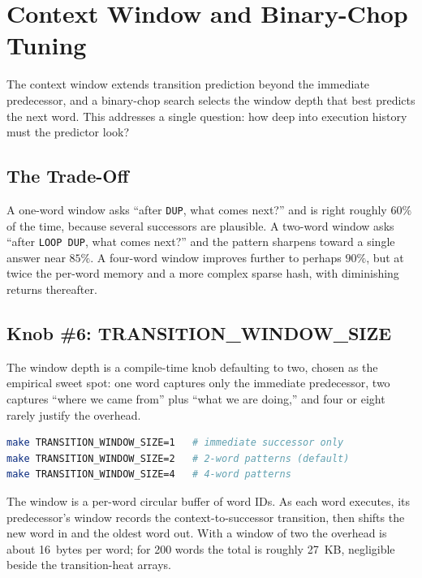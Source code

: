 
\section{Context Window and Binary-Chop Tuning}

The context window extends transition prediction beyond the immediate
predecessor, and a binary-chop search selects the window depth that best
predicts the next word. This addresses a single question: how deep into
execution history must the predictor look?

\subsection{The Trade-Off}

A one-word window asks ``after \texttt{DUP}, what comes next?'' and is right
roughly $60\%$ of the time, because several successors are plausible. A two-word
window asks ``after \texttt{LOOP DUP}, what comes next?'' and the pattern
sharpens toward a single answer near $85\%$. A four-word window improves further
to perhaps $90\%$, but at twice the per-word memory and a more complex sparse
hash, with diminishing returns thereafter.

\subsection{Knob \#6: TRANSITION\_WINDOW\_SIZE}

The window depth is a compile-time knob defaulting to two, chosen as the
empirical sweet spot: one word captures only the immediate predecessor, two
captures ``where we came from'' plus ``what we are doing,'' and four or eight
rarely justify the overhead.

\begin{lstlisting}[language=bash]
make TRANSITION_WINDOW_SIZE=1   # immediate successor only
make TRANSITION_WINDOW_SIZE=2   # 2-word patterns (default)
make TRANSITION_WINDOW_SIZE=4   # 4-word patterns
\end{lstlisting}

The window is a per-word circular buffer of word IDs. As each word executes, its
predecessor's window records the context-to-successor transition, then shifts
the new word in and the oldest word out. With a window of two the overhead is
about 16~bytes per word; for 200 words the total is roughly 27~KB, negligible
beside the transition-heat arrays.

